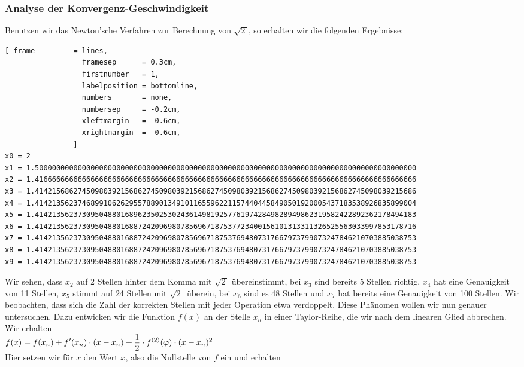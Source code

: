 \subsubsection{Analyse der Konvergenz-Geschwindigkeit}
Benutzen wir das Newton'sche Verfahren zur Berechnung  von $\sqrt{2\,}$, so erhalten wir 
die folgenden Ergebnisse:
{\footnotesize
\begin{Verbatim}[ frame         = lines, 
                  framesep      = 0.3cm, 
                  firstnumber   = 1,
                  labelposition = bottomline,
                  numbers       = none,
                  numbersep     = -0.2cm,
                  xleftmargin   = -0.6cm,
                  xrightmargin  = -0.6cm,
                ]
x0 = 2
x1 = 1.50000000000000000000000000000000000000000000000000000000000000000000000000000000000000000
x2 = 1.41666666666666666666666666666666666666666666666666666666666666666666666666666666666666666
x3 = 1.41421568627450980392156862745098039215686274509803921568627450980392156862745098039215686
x4 = 1.41421356237468991062629557889013491011655962211574404458490501920005437183538926835899004
x5 = 1.41421356237309504880168962350253024361498192577619742849828949862319582422892362178494183
x6 = 1.41421356237309504880168872420969807856967187537723400156101313311326525563033997853178716
x7 = 1.41421356237309504880168872420969807856967187537694807317667973799073247846210703885038753
x8 = 1.41421356237309504880168872420969807856967187537694807317667973799073247846210703885038753
x9 = 1.41421356237309504880168872420969807856967187537694807317667973799073247846210703885038753
\end{Verbatim}
}
Wir sehen, dass $x_2$ auf 2 Stellen hinter dem Komma mit $\sqrt{2\,}$ \"ubereinstimmt,
bei $x_3$ sind bereits 5 Stellen richtig, $x_4$ hat eine Genauigkeit von 11 Stellen,
$x_5$ stimmt auf 24 Stellen mit $\sqrt{2\,}$ \"uberein, bei $x_6$ sind es 48 Stellen und $x_7$ hat
bereits eine Genauigkeit von 100 Stellen.  Wir beobachten, dass sich die Zahl der korrekten Stellen mit
jeder Operation etwa verdoppelt.  Diese Ph\"anomen wollen wir nun genauer untersuchen.
Dazu entwicken wir die Funktion $f(x)$ an der Stelle $x_n$  in einer Taylor-Reihe, die wir nach dem
linearen Glied abbrechen.  Wir erhalten
\\[0.2cm]
\hspace*{1.3cm}
$\displaystyle f(x) = f(x_n) + f'(x_n) \cdot (x- x_n) + \frac{1}{2} \cdot f^{(2)}(\varphi) \cdot (x - x_n)^2$
\\[0.2cm]
Hier setzen wir f\"ur $x$ den Wert $\bar{x}$, also die Nullstelle von $f$ ein und erhalten
